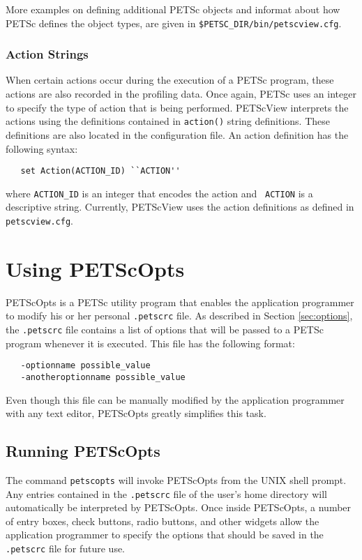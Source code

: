 More examples on defining additional PETSc objects and informat
about how PETSc defines the object types, are given in 
{\tt \$PETSC\_DIR/bin/petscview.cfg}.

\subsubsection{Action Strings}

When certain actions occur during the execution of a PETSc program,
these actions are also recorded in the profiling data.  Once again,
PETSc uses an integer to specify the type of action that is being
performed.  PETScView interprets the actions using the
definitions contained in {\tt action()} string definitions.  These
definitions are also located in the configuration file.  An action
definition has the following syntax:
\begin{verbatim}
   set Action(ACTION_ID) ``ACTION''
\end{verbatim}
where {\tt ACTION\_ID} is an integer that encodes the action and {\tt
ACTION} is a descriptive string.  Currently, PETScView uses the action
definitions as defined in {\tt petscview.cfg}.

\section{Using PETScOpts}
\label{sec:petscopts}

PETScOpts is a PETSc utility program that enables the application
programmer to modify his or her personal {\tt .petscrc} file.  As
described in Section \ref{sec:options}, the {\tt .petscrc} file
contains a list of options that will be passed to a PETSc program
whenever it is executed.  This file has the following format:
\begin{verbatim}
   -optionname possible_value
   -anotheroptionname possible_value
\end{verbatim}
Even though this file can be manually modified by the application
programmer with any text editor, PETScOpts greatly simplifies this
task.

\subsection{Running PETScOpts}

The command {\tt petscopts} will invoke PETScOpts from the UNIX
shell prompt.  Any entries contained in the {\tt .petscrc} file of the
user's home directory will automatically be interpreted by PETScOpts.
Once inside PETScOpts, a number of entry boxes, check
buttons, radio buttons, and other widgets allow the application
programmer to specify the options that should be saved in the {\tt
.petscrc} file for future use.

